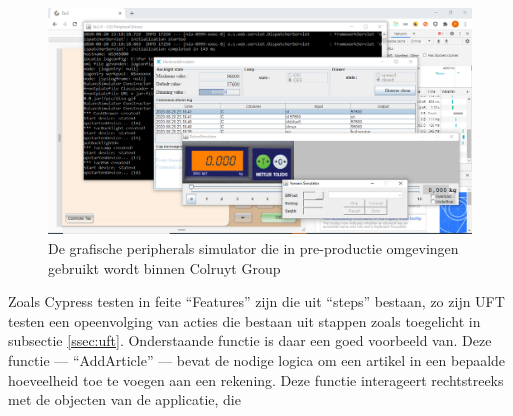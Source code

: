 \begin{figure}[h!]
    \centering
    \includegraphics[scale=0.35]{img/corpus/tac20-peripherals.PNG}
    \caption{De grafische peripherals simulator die in pre-productie omgevingen gebruikt wordt binnen Colruyt Group}
    \label{fig:tac2point0-peripherals}
\end{figure}

Zoals Cypress testen in feite ``Features'' zijn die uit ``steps'' bestaan, zo zijn UFT testen een opeenvolging van acties die bestaan uit stappen zoals toegelicht in subsectie \ref{ssec:uft}. Onderstaande functie is daar een goed voorbeeld van. Deze functie — ``AddArticle'' — bevat de nodige logica om een artikel in een bepaalde hoeveelheid toe te voegen aan een rekening. Deze functie interageert rechtstreeks met de objecten van de applicatie, die 


